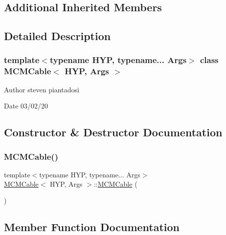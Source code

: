 \subsection*{Additional Inherited Members}


\subsection{Detailed Description}
\subsubsection*{template$<$typename H\+YP, typename... Args$>$\newline
class M\+C\+M\+Cable$<$ H\+Y\+P, Args $>$}

\begin{DoxyAuthor}{Author}
steven piantadosi 
\end{DoxyAuthor}
\begin{DoxyDate}{Date}
03/02/20 
\end{DoxyDate}


\subsection{Constructor \& Destructor Documentation}
\mbox{\label{class_m_c_m_cable_aac715433bffb674dd5809e7c1bc59ae5}} 
\subsubsection{\texorpdfstring{M\+C\+M\+Cable()}{MCMCable()}}
{\footnotesize\ttfamily template$<$typename H\+YP, typename... Args$>$ \\
\hyperlink{class_m_c_m_cable}{M\+C\+M\+Cable}$<$ H\+YP, Args $>$\+::\hyperlink{class_m_c_m_cable}{M\+C\+M\+Cable} (\begin{DoxyParamCaption}{ }\end{DoxyParamCaption})\hspace{0.3cm}{\ttfamily [inline]}}



\subsection{Member Function Documentation}
\mbox{\label{class_m_c_m_cable_aa73001ec3bb0cf0c618281dfa998f2f1}} 
